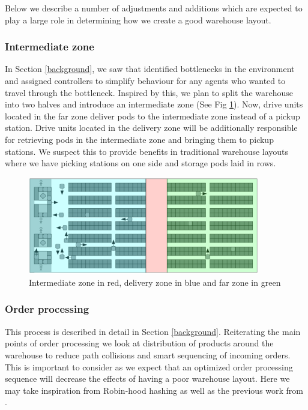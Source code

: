 \documentclass[a4paper,11pt]{article}
\begin{document}
\noindent Below we describe a number of adjustments and additions which are expected to play a large role in determining how we create a good warehouse layout.

\subsubsection{Intermediate zone}
\label{intermediatezone}
In Section \ref{background}, we saw that \cite{wilt2014spatially} identified bottlenecks in the environment and assigned controllers to simplify behaviour for any agents who wanted to travel through the bottleneck. Inspired by this, we plan to split the warehouse into two halves and introduce an intermediate zone (See Fig \ref{kivalayout2}). Now, drive units located in the far zone deliver pods to the intermediate zone instead of a pickup station. Drive units located in the delivery zone will be additionally responsible for retrieving pods in the intermediate zone and bringing them to pickup stations. We suspect this to provide benefits in traditional warehouse layouts where we have picking stations on one side and storage pods laid in rows.

\begin{figure}[h]
	\centering
	\includegraphics[width=0.9\textwidth]{graphics/kivasystemlayout_adjusted}
	\caption{Intermediate zone in red, delivery zone in blue and far zone in green}
	\label{kivalayout2}
\end{figure}

\subsubsection{Order processing}
\label{orderprocessing}
This process is described in detail in Section \ref{background}. Reiterating the main points of order processing we look at distribution of products around the warehouse to reduce path collisions and smart sequencing of incoming orders. This is important to consider as we expect that an optimized order processing sequence will decrease the effects of having a poor warehouse layout. Here we may take inspiration from Robin-hood hashing as well as the previous work from \cite{boysen2017parts}.
\end{document}
